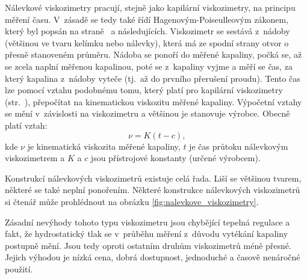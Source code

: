 \documentclass[12pt]{article}
\begin{document}
Nálevkové viskozimetry pracují, stejně jako kapilární viskozimetry, na principu měření času. V~zásadě se tedy také řídí Hagenovým-Poiseulleovým zákonem, který byl popsán na straně~\pageref{sec:tečení_trubicí} a následujících. Viskozimetr se sestává z~nádoby (většinou ve tvaru kelímku nebo nálevky), která má ze spodní strany otvor o přesně stanoveném průměru. Nádoba se ponoří do měřené kapaliny, počká se, až se zcela naplní měřenou kapalinou, poté se z~kapaliny vyjme a měří se čas, za který kapalina z~nádoby vyteče (tj.~až do prvního přerušení proudu). Tento čas lze pomocí vztahu podobnému tomu, který platí pro kapilární viskozimetry (str.~\pageref{eq:kapilarni_viskozimetr}), přepočítat na kinematickou viskozitu měřené kapaliny. Výpočetní vztahy se mění v~závislosti na viskozimetru a většinou je stanovuje výrobce. Obecně platí vztah:~\cite{Article:Rapid_and_economic_chocolate_viscosity}
\begin{equation}
    \nu = K(t-c)\text{,}
\end{equation}
kde $\nu$ je kinematická viskozita měřené kapaliny, $t$ je čas průtoku nálevkovým viskozimetrem a $K$ a $c$ jsou přístrojové konstanty (určené výrobcem).
\par\noindent
Konstrukcí nálevkových viskozimetrů existuje celá řada. Liší se většinou tvarem, některé se také neplní ponořením. Některé konstrukce nálevkových viskozimetrů si čtenář může prohlédnout na obrázku \ref{fig:nalevkove_viskozimetry}.
\par\noindent
Zásadní nevýhody tohoto typu viskozimetru jsou chybějící tepelná regulace a fakt, že hydrostatický tlak se v~průběhu měření z~důvodu vytékání kapaliny postupně mění. Jsou tedy oproti ostatním druhům viskozimetrů méně přesné. Jejich výhodou je nízká cena, dobrá dostupnost, jednoduché a časově nenáročné použití.
\end{document}

